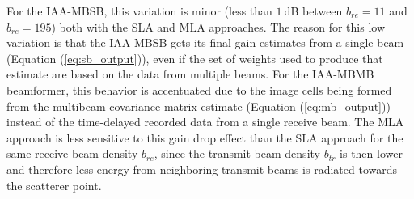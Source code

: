 For the IAA-MBSB, this variation is minor (less than $1~$dB between $b_{re} = 11$ and $b_{re} = 195$) both with the SLA and MLA approaches.
The reason for this low variation is that the IAA-MBSB gets its final gain estimates from a single beam (Equation (\ref{eq:sb_output})), even if the set of weights used to produce that estimate are based on the data from multiple beams.
For the IAA-MBMB beamformer, this behavior is accentuated due to the image cells being formed from the multibeam covariance matrix estimate (Equation (\ref{eq:mb_output})) instead of the time-delayed recorded data from a single receive beam.
The MLA approach is less sensitive to this gain drop effect than the SLA approach for the same receive beam density $b_{re}$, since the transmit beam density $b_{tr}$ is then lower and therefore less energy from neighboring transmit beams is radiated towards the scatterer point.

